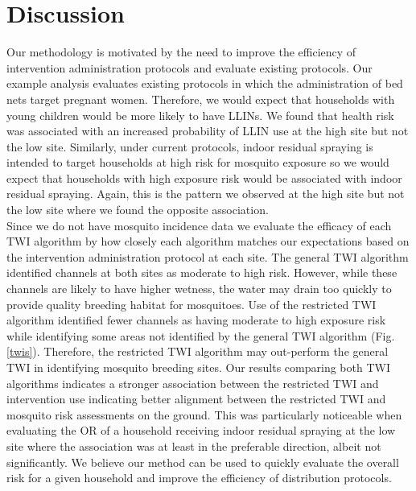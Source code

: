 \documentclass{article}\usepackage[]{graphicx}\usepackage[]{color}
\begin{document}


\section{Discussion}
Our methodology is motivated by the need to improve the efficiency of intervention administration protocols and evaluate existing protocols.  Our example analysis evaluates existing protocols in which the administration of bed nets target pregnant women.  Therefore,  we would expect that households with young children would be more likely to have LLINs.  We found that health risk was associated with an increased probability of LLIN use at the high site but not the low site.  Similarly, under current protocols, indoor residual spraying is intended to target households at high risk for mosquito exposure  so we would expect that households with high exposure risk would be associated with indoor residual spraying.  Again,  this is the pattern we observed at the high site but not the low site where we found the opposite association.\\

Since we do not have mosquito incidence data we evaluate the efficacy of each TWI algorithm by how closely each algorithm matches our expectations based on the intervention administration protocol at each site.  The general TWI algorithm identified channels at both sites as moderate to high risk.  However, while these channels are likely to have higher wetness, the water may drain too quickly to provide quality breeding habitat for mosquitoes.  Use of the restricted TWI algorithm identified fewer channels as having moderate to high exposure risk while identifying some areas not identified by the general TWI algorithm (Fig. \ref{twis}).  Therefore, the restricted TWI algorithm may out-perform the general TWI in identifying mosquito breeding sites.  Our results comparing both TWI algorithms indicates a stronger association between the restricted TWI and intervention use indicating better alignment between the restricted TWI and mosquito risk assessments on the ground. This was particularly noticeable when evaluating the OR of a household receiving indoor residual spraying at the low site where the association was at least in the preferable direction, albeit not significantly.  We believe our method can be used to quickly evaluate the overall risk for a given household and improve the efficiency of distribution protocols.\\
\end{document}
